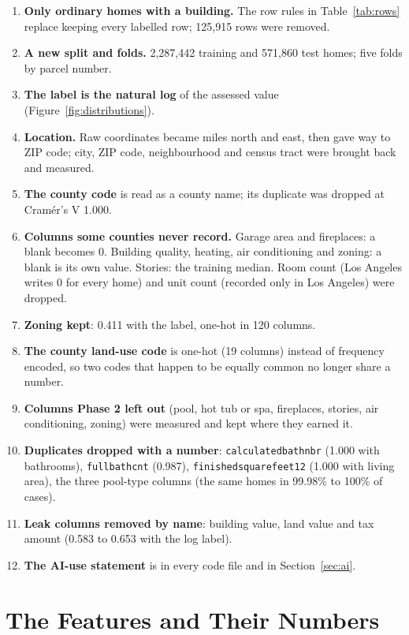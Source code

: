 \documentclass[sigconf,nonacm,10pt]{acmart}
\begin{document}
\begin{enumerate}
\item \textbf{Only ordinary homes with a building.} The row rules in Table~\ref{tab:rows} replace keeping every labelled row; 125,915 rows were removed.
\item \textbf{A new split and folds.} 2,287,442 training and 571,860 test homes; five folds by parcel number.
\item \textbf{The label is the natural log} of the assessed value (Figure~\ref{fig:distributions}).
\item \textbf{Location.} Raw coordinates became miles north and east, then gave way to ZIP code; city, ZIP code, neighbourhood and census tract were brought back and measured.
\item \textbf{The county code} is read as a county name; its duplicate was dropped at Cram\'er's V 1.000.
\item \textbf{Columns some counties never record.} Garage area and fireplaces: a blank becomes 0. Building quality, heating, air conditioning and zoning: a blank is its own value. Stories: the training median. Room count (Los Angeles writes 0 for every home) and unit count (recorded only in Los Angeles) were dropped.
\item \textbf{Zoning kept}: 0.411 with the label, one-hot in 120 columns.
\item \textbf{The county land-use code} is one-hot (19 columns) instead of frequency encoded, so two codes that happen to be equally common no longer share a number.
\item \textbf{Columns Phase 2 left out} (pool, hot tub or spa, fireplaces, stories, air conditioning, zoning) were measured and kept where they earned it.
\item \textbf{Duplicates dropped with a number}: \texttt{calculatedbathnbr} (1.000 with bathrooms), \texttt{fullbathcnt} (0.987), \texttt{finishedsquarefeet12} (1.000 with living area), the three pool-type columns (the same homes in 99.98\% to 100\% of cases).
\item \textbf{Leak columns removed by name}: building value, land value and tax amount (0.583 to 0.653 with the log label).
\item \textbf{The AI-use statement} is in every code file and in Section~\ref{sec:ai}.
\end{enumerate}

\section{The Features and Their Numbers}
\label{app:features}
\end{document}
